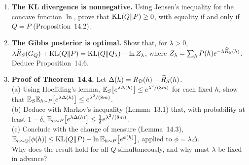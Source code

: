 \documentclass[a4paper,11pt]{article}
\begin{document}
\begin{enumerate}
\item \textbf{The KL divergence is nonnegative.} Using Jensen's inequality for the concave function $\ln$, prove that
      $\operatorname{KL}(Q\|P)\geq0$, with equality if and only if $Q=P$ (Proposition~14.2).
\item \textbf{The Gibbs posterior is optimal.} Show that, for $\lambda>0$,
      $\lambda\widehat{R}_{S}(G_{Q})+\operatorname{KL}(Q\|P)=\operatorname{KL}(Q\|Q_\lambda)-\ln Z_\lambda$, where
      $Z_\lambda=\sum_hP(h)e^{-\lambda\widehat{R}_{S}(h)}$.\\
      Deduce Proposition~14.6.
\item \textbf{Proof of Theorem~14.4.} Let $\Delta(h)=R_{\mathcal{D}}(h)-\widehat{R}_{S}(h)$.\\
      (a) Using Hoeffding's lemma, $\mathbb{E}_S\big[e^{\lambda\Delta(h)}\big]\leq e^{\lambda^2/(8m)}$ for each fixed $h$, show that
      $\mathbb{E}_S\mathbb{E}_{h\sim P}\big[e^{\lambda\Delta(h)}\big]\leq e^{\lambda^2/(8m)}$.\\
      (b) Deduce with Markov's inequality (Lemma~13.1) that, with probability at least $1-\delta$,
      $\mathbb{E}_{h\sim P}\big[e^{\lambda\Delta(h)}\big]\leq\frac1\delta e^{\lambda^2/(8m)}$.\\
      (c) Conclude with the change of measure (Lemma~14.3),
      $\mathbb{E}_{h\sim Q}[\phi(h)]\leq\operatorname{KL}(Q\|P)+\ln\mathbb{E}_{h\sim P}\big[e^{\phi(h)}\big]$, applied to $\phi=\lambda\Delta$.\\
      Why does the result hold for all $Q$ simultaneously, and why must $\lambda$ be fixed in advance?
\end{enumerate}
\end{document}
